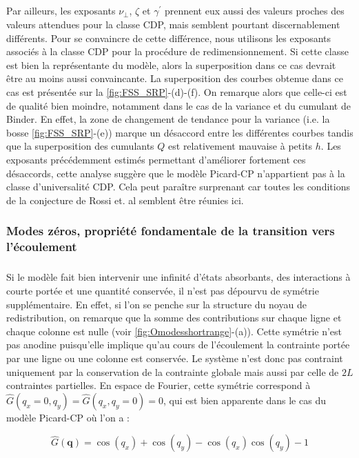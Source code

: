 \subparagraph{}Par ailleurs, les exposants $\nu_\perp$, $\zeta$ et $\gamma^\prime$ prennent eux aussi des valeurs proches des valeurs attendues pour la classe CDP, mais semblent pourtant discernablement différents. Pour se convaincre de cette différence, nous utilisons les exposants associés à la classe CDP pour la procédure de redimensionnement. Si cette classe est bien la représentante du modèle, alors la superposition dans ce cas devrait être au moins aussi convaincante. La superposition des courbes obtenue dans ce cas est présentée sur la \autoref{fig:FSS_SRP}-(d)-(f). On remarque alors que celle-ci est de qualité bien moindre, notamment dans le cas de la variance et du cumulant de Binder. En effet, la zone de changement de tendance pour la variance (i.e. la bosse \autoref{fig:FSS_SRP}-(e)) marque un désaccord entre les différentes courbes tandis que la superposition des cumulants $Q$ est relativement mauvaise à petits $h$. Les exposants précédemment estimés permettant d'améliorer fortement ces désaccords, cette analyse suggère que le modèle Picard-CP n'appartient pas à la classe d'universalité CDP. Cela peut paraître surprenant car toutes les conditions de la conjecture de Rossi et. al \cite{rossi_universality_2000} semblent être réunies ici.

\subsubsection{Modes zéros, propriété fondamentale de la transition vers l'écoulement}

\subparagraph{}Si le modèle fait bien intervenir une infinité d'états absorbants, des interactions à courte portée et une quantité conservée, il n'est pas dépourvu de symétrie supplémentaire. En effet, si l'on se penche sur la structure du noyau de redistribution, on remarque que la somme des contributions sur chaque ligne et chaque colonne est nulle (voir \autoref{fig:Omodesshortrange}-(a)). Cette symétrie n'est pas anodine puisqu'elle implique qu'au cours de l'écoulement la contrainte portée par une ligne ou une colonne est conservée. Le système n'est donc pas contraint uniquement par la conservation de la contrainte globale mais aussi par celle de $2L$ contraintes partielles. En espace de Fourier, cette symétrie correspond à $\hat{G}(q_x=0,q_y)=\hat{G}(q_x,q_y=0)=0$, qui est bien apparente dans le cas du modèle Picard-CP où l'on a :

\begin{equation}
	\hat{G}(\mathbf{q}) = \cos(q_x) + \cos(q_y) -\cos(q_x)\cos(q_y) -1
\end{equation}


